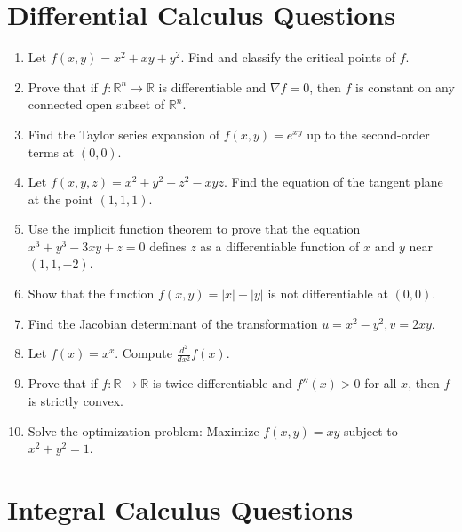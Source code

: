 \documentclass{article}
\begin{document}
\section*{Differential Calculus Questions}

\begin{enumerate}
    \item Let \( f(x, y) = x^2 + xy + y^2 \). Find and classify the critical points of \( f \).

    \item Prove that if \( f : \mathbb{R}^n \to \mathbb{R} \) is differentiable and \( \nabla f = 0 \), then \( f \) is constant on any connected open subset of \( \mathbb{R}^n \).

    \item Find the Taylor series expansion of \( f(x, y) = e^{xy} \) up to the second-order terms at \( (0, 0) \).

    \item Let \( f(x, y, z) = x^2 + y^2 + z^2 - xyz \). Find the equation of the tangent plane at the point \( (1, 1, 1) \).

    \item Use the implicit function theorem to prove that the equation \( x^3 + y^3 - 3xy + z = 0 \) defines \( z \) as a differentiable function of \( x \) and \( y \) near \( (1, 1, -2) \).

    \item Show that the function \( f(x, y) = |x| + |y| \) is not differentiable at \( (0, 0) \).

    \item Find the Jacobian determinant of the transformation \( u = x^2 - y^2, v = 2xy \).

    \item Let \( f(x) = x^x \). Compute \( \frac{d^2}{dx^2} f(x) \).

    \item Prove that if \( f : \mathbb{R} \to \mathbb{R} \) is twice differentiable and \( f''(x) > 0 \) for all \( x \), then \( f \) is strictly convex.

    \item Solve the optimization problem: Maximize \( f(x, y) = xy \) subject to \( x^2 + y^2 = 1 \).
\end{enumerate}

\section*{Integral Calculus Questions}
\end{document}
